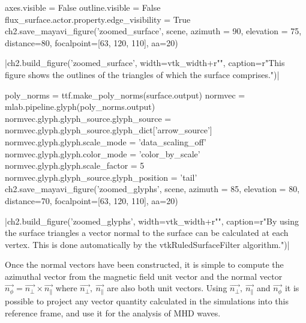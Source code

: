 \begin{pycode}[chapter2]
axes.visible = False
outline.visible = False
flux_surface.actor.property.edge_visibility = True
ch2.save_mayavi_figure('zoomed_surface', scene, azimuth = 90, elevation = 75, distance=80, focalpoint=[63, 120, 110], aa=20)
\end{pycode}
\py[chapter2]|ch2.build_figure('zoomed_surface', width=vtk_width+r"\columnwidth",
caption=r"This figure shows the outlines of the triangles of which the surface comprises.")|


\begin{pycode}[chapter2]
poly_norms = ttf.make_poly_norms(surface.output)
normvec = mlab.pipeline.glyph(poly_norms.output)
normvec.glyph.glyph_source.glyph_source = normvec.glyph.glyph_source.glyph_dict['arrow_source']
normvec.glyph.glyph.scale_mode = 'data_scaling_off'
normvec.glyph.glyph.color_mode = 'color_by_scale'
normvec.glyph.glyph.scale_factor = 5
normvec.glyph.glyph_source.glyph_position = 'tail'
ch2.save_mayavi_figure('zoomed_glyphs', scene, azimuth = 85, elevation = 80, distance=70, focalpoint=[63, 120, 110], aa=20)
\end{pycode}
\py[chapter2]|ch2.build_figure('zoomed_glyphs', width=vtk_width+r"\columnwidth",
caption=r"By using the surface triangles a vector normal to the surface can be calculated at each vertex. This is done automatically by the vtkRuledSurfaceFilter algorithm.")|

Once the normal vectors have been constructed, it is simple to compute the azimuthal vector from the magnetic field unit vector and the normal vector $\vec{n_\phi}= \vec{n_\perp} \times \vec{n_\parallel}$ where $\vec{n_\perp},\ \vec{n_\parallel} $ are also both unit vectors. 
Using  $\vec{n_\perp},\ \vec{n_\parallel}$ and $\vec{n_\phi}$ it  is possible to project any vector quantity calculated in the simulations into this reference frame, and use it for the analysis of MHD waves.
